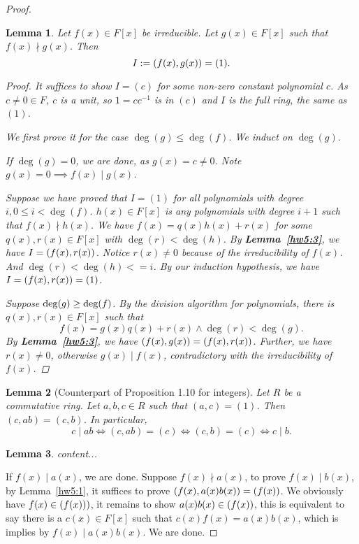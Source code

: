 \documentclass[12pt,letterpaper]{article}
\newtheorem{lemma}{Lemma}
\newcommand{\lparen}[1]{\large(#1\large)}
\begin{document}
\begin{enumerate}[(a)]
\begin{proof}
			\begin{lemma}
				Let $f(x)\in F[x]$ be irreducible. Let $g(x)\in F[x]$ such that $f(x)\nmid g(x)$. Then\[ I:=\lparen{f(x), g(x)}=(1).\]
				\begin{proof}					
					It suffices to show $I=(c)$ for some non-zero constant polynomial $c$. As $c\ne 0\in F$, $c$ is a unit, so $1=cc^{-1}$ is in $(c)$ and $I$ is the full ring, the same as $(1)$.
					
					We first prove it for the case $\deg(g)\le \deg(f)$. We induct on $\deg(g)$.
					
					If $\deg(g)=0$, we are done, as $g(x)=c\ne 0$. Note $g(x)=0\implies f(x)\mid g(x)$.
					
					Suppose we have proved that $I=(1)$ for all polynomials with degree $i, 0\le i<\deg(f)$. $h(x)\in F[x]$ is any polynomials with degree $i+1$ such that $f(x)\nmid h(x)$. We have $f(x)=q(x)h(x)+r(x)$ for some $q(x),r(x)\in F[x]$ with $\deg(r)<\deg(h)$. By \textbf{Lemma~\ref{hw5:3}}, we have $I=\lparen{f(x),r(x)}$. Notice $r(x)\ne 0$ because of the irreducibility of $f(x)$. And $\deg(r)<\deg(h)<=i$. By our induction hypothesis, we have $I=\lparen{f(x),r(x)}=(1)$.
					
					 Suppose $\deg\lparen{g}\ge \deg(f)$. By the division algorithm for polynomials, there is $q(x),r(x)\in F[x]$ such that\[
					f(x)=g(x)q(x)+r(x) \land \deg(r)<\deg(g).\]
					By \textbf{Lemma~\ref{hw5:3}}, we have $\lparen{f(x),g(x)}=\lparen{f(x),r(x)}$. Further, we have $r(x)\ne 0$, otherwise $g(x)\mid f(x)$, contradictory with the irreducibility of $f(x)$.				 
				\end{proof}					
			\end{lemma}
			\begin{lemma}[Counterpart of Proposition 1.10 for integers]\label{hw5:4}
				Let $R$ be a commutative ring. Let $a,b,c\in R$ such that $(a,c)=(1)$. Then $(c,ab)=(c,b)$. In particular,\[
					c \mid ab \iff (c,ab)=(c)\iff (c,b)=(c) \iff c \mid b.
				\]
			\end{lemma}
		
			\begin{lemma}
				content...
			\end{lemma}
		If $f(x)\mid a(x)$, we are done. Suppose $f(x)\nmid a(x)$, to prove $f(x)\mid b(x)$, by Lemma~\ref{hw5:1}, it suffices to prove $\large(f(x),a(x)b(x)\large)=\large(f(x)\large)$. We obviously have $f(x)\in \large(f(x)\large))$, it remains to show $a(x)b(x)\in \large( f(x)\large)$, this is equivalent to say there is a $c(x)\in F[x]$ such that $c(x)f(x)=a(x)b(x)$, which is implies by $f(x)\mid a(x)b(x)$. We are done.
		\end{proof}


\end{enumerate}
\end{document}
